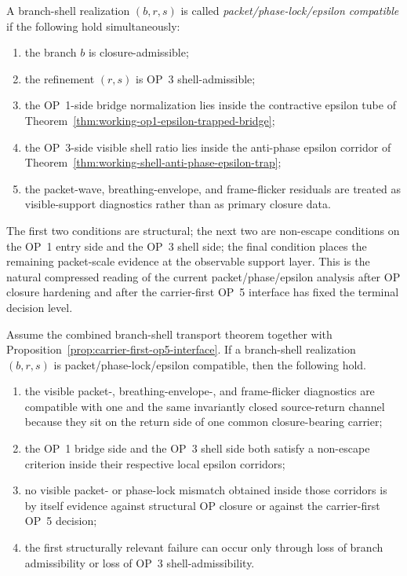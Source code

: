 \begin{definition}
A branch-shell realization $(b,r,s)$ is called \emph{packet/phase-lock/epsilon compatible} if the following hold simultaneously:
\begin{enumerate}[leftmargin=2em,label=(\roman*)]
\item the branch $b$ is closure-admissible;
\item the refinement $(r,s)$ is OP~3 shell-admissible;
\item the OP~1-side bridge normalization lies inside the contractive epsilon tube of Theorem~\ref{thm:working-op1-epsilon-trapped-bridge};
\item the OP~3-side visible shell ratio lies inside the anti-phase epsilon corridor of Theorem~\ref{thm:working-shell-anti-phase-epsilon-trap};
\item the packet-wave, breathing-envelope, and frame-flicker residuals are treated as visible-support diagnostics rather than as primary closure data.
\end{enumerate}
\end{definition}

\begin{remark}
The first two conditions are structural; the next two are non-escape conditions on the OP~1 entry side and the OP~3 shell side; the final condition places the remaining packet-scale evidence at the observable support layer. This is the natural compressed reading of the current packet/phase/epsilon analysis after OP closure hardening and after the carrier-first OP~5 interface has fixed the terminal decision level.
\end{remark}

\begin{corollary}
\label{cor:packet-phase-epsilon-compatibility}
Assume the combined branch-shell transport theorem together with Proposition~\ref{prop:carrier-first-op5-interface}. If a branch-shell realization $(b,r,s)$ is packet/phase-lock/epsilon compatible, then the following hold.
\begin{enumerate}[leftmargin=2em,label=(\roman*)]
\item the visible packet-, breathing-envelope-, and frame-flicker diagnostics are compatible with one and the same invariantly closed source-return channel because they sit on the return side of one common closure-bearing carrier;
\item the OP~1 bridge side and the OP~3 shell side both satisfy a non-escape criterion inside their respective local epsilon corridors;
\item no visible packet- or phase-lock mismatch obtained inside those corridors is by itself evidence against structural OP closure or against the carrier-first OP~5 decision;
\item the first structurally relevant failure can occur only through loss of branch admissibility or loss of OP~3 shell-admissibility.
\end{enumerate}
\end{corollary}

